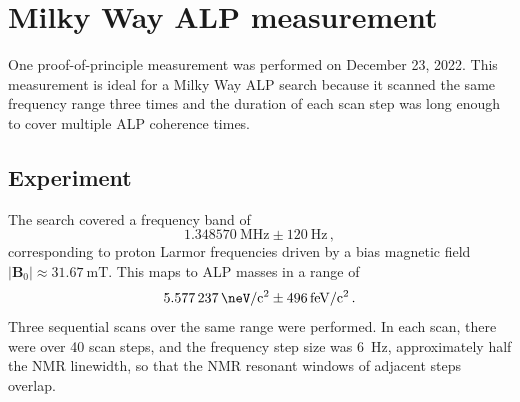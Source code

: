 


\section{Milky Way ALP measurement}\label{sec:results:MWALP20221223}

One proof-of-principle measurement was performed on December 23, 2022. This measurement is ideal for a Milky Way ALP search because it scanned the same frequency range three times and the duration of each scan step was long enough to cover multiple ALP coherence times.

\subsection{Experiment}\label{sec:results:MWALP20221223:experiment}

The search covered a frequency band of
\begin{equation}
    \SI{1.348570}{\MHz}\pm\SI{120}{\Hz}
    \,,\nonumber
\end{equation}
corresponding to proton Larmor frequencies driven by a bias magnetic field $|\boldsymbol{B}_0| \approx \SI{31.67}{\milli\tesla}$.
This maps to ALP masses in a range of
\begin{equation}
    \SI{5.577237}{\neV/c^2}\pm\SI{496}{\femto\eV/c^2}
    \,.\nonumber
\end{equation}
Three sequential scans over the same range were performed.
In each scan, there were over 40 scan steps, and the frequency step size was \SI{6}{\Hz}, approximately half the NMR linewidth, so that the NMR resonant windows of adjacent steps overlap.

